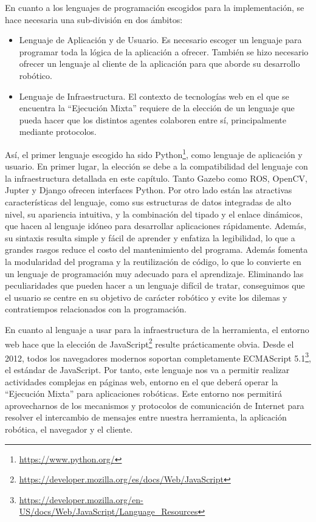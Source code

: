 En cuanto a los lenguajes de programación escogidos para la implementación, se hace necesaria una sub-división en dos ámbitos:

\begin{itemize}
    \item Lenguaje de Aplicación y de Usuario. Es necesario escoger un lenguaje para programar toda la lógica de la aplicación a ofrecer. También se hizo necesario ofrecer un lenguaje al cliente de la aplicación para que aborde su desarrollo robótico.
    \item Lenguaje de Infraestructura. El contexto de tecnologías web en el que se encuentra la ``Ejecución Mixta'' requiere de la elección de un lenguaje que pueda hacer que los distintos agentes colaboren entre sí, principalmente mediante protocolos.
\end{itemize}

Así, el primer lenguaje escogido ha sido Python\footnote{\url{https://www.python.org/}}, como lenguaje de aplicación y usuario. En primer lugar, la elección se debe a la compatibilidad del lenguaje con la infraestructura detallada en este capítulo. Tanto Gazebo como ROS, OpenCV, Jupter y Django ofrecen interfaces Python. Por otro lado están las atractivas características del lenguaje, como sus estructuras de datos integradas de alto nivel, su apariencia intuitiva, y la combinación del tipado y el enlace dinámicos, que hacen al lenguaje idóneo para desarrollar aplicaciones rápidamente. Además, su sintaxis resulta simple y fácil de aprender y enfatiza la legibilidad, lo que a grandes rasgos reduce el costo del mantenimiento del programa. Además fomenta la modularidad del programa y la reutilización de código, lo que lo convierte en un lenguaje de programación muy adecuado para el aprendizaje. Eliminando las peculiaridades que pueden hacer a un lenguaje difícil de tratar, conseguimos que el usuario se centre en su objetivo de carácter robótico y evite los dilemas y contratiempos relacionados con la programación.

En cuanto al lenguaje a usar para la infraestructura de la herramienta, el entorno web hace que la elección de JavaScript\footnote{\url{https://developer.mozilla.org/es/docs/Web/JavaScript}} resulte prácticamente obvia. Desde el 2012, todos los navegadores modernos soportan completamente ECMAScript 5.1\footnote{\url{https://developer.mozilla.org/en-US/docs/Web/JavaScript/Language_Resources}}, el estándar de JavaScript. Por tanto, este lenguaje nos va a permitir realizar actividades complejas en páginas web, entorno en el que deberá operar la ``Ejecución Mixta'' para aplicaciones robóticas. Este entorno nos permitirá aprovecharnos de los mecanismos y protocolos de comunicación de Internet para resolver el intercambio de mensajes entre nuestra herramienta, la aplicación robótica, el navegador y el cliente.